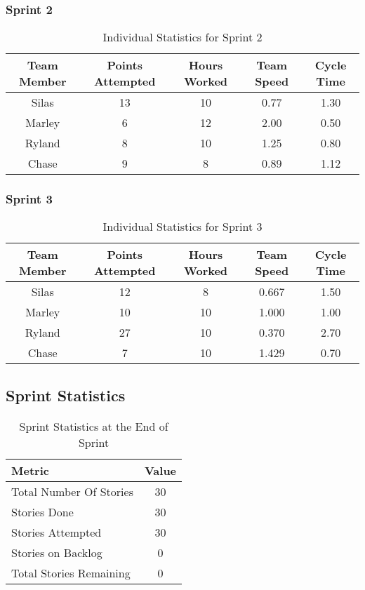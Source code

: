 \subsubsection{Sprint 2}
\begin{table}[H]
    \centering
    \begin{tabular}{|c|c|c|c|c|}
    \hline
    \textbf{Team Member} & \textbf{Points Attempted} & \textbf{Hours Worked} & \textbf{Team Speed} & \textbf{Cycle Time}  \\ \hline
    Silas & 13 & 10 & 0.77 & 1.30 \\ \hline
    Marley & 6 & 12 & 2.00 & 0.50 \\ \hline
    Ryland & 8 & 10 & 1.25 & 0.80 \\ \hline
    Chase & 9 & 8 & 0.89 & 1.12 \\ \hline
    \end{tabular}
    \caption{Individual Statistics for Sprint 2}
    \label{tab:individual_sprint2}
\end{table}

\subsubsection{Sprint 3}
\begin{table}[H]
    \centering
    \begin{tabular}{|c|c|c|c|c|}
    \hline
    \textbf{Team Member} & \textbf{Points Attempted} & \textbf{Hours Worked} & \textbf{Team Speed} & \textbf{Cycle Time}  \\ \hline
    Silas & 12 & 8 & 0.667 & 1.50 \\ \hline
    Marley & 10 & 10 & 1.000 & 1.00 \\ \hline
    Ryland & 27 & 10 & 0.370 & 2.70 \\ \hline
    Chase & 7 & 10 & 1.429 & 0.70 \\ \hline
    \end{tabular}
    \caption{Individual Statistics for Sprint 3}
    \label{tab:individual_sprint3}
\end{table}

\subsection{Sprint Statistics}
\begin{table}[H]
    \centering
    \begin{tabular}{|l|c|}
    \hline
    \textbf{Metric} & \textbf{Value} \\ \hline
    Total Number Of Stories & 30 \\ \hline
    Stories Done & 30 \\ \hline
    Stories Attempted & 30 \\ \hline
    Stories on Backlog & 0 \\ \hline
    Total Stories Remaining & 0 \\ \hline
    \end{tabular}
    \caption{Sprint Statistics at the End of Sprint}
    \label{tab:sprint_statistics}
\end{table}

